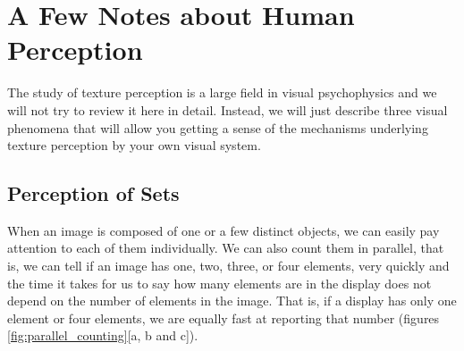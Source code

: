 \section{A Few Notes about Human Perception}


The study of texture perception 
is a large field in visual psychophysics and we will not try to review it here in detail. Instead, we will just describe three visual phenomena that will allow you getting a sense of the mechanisms underlying texture perception by your own visual system. 


\subsection{Perception of Sets}

When an image is composed of one or a few distinct objects, we can easily pay attention to each of them individually. We can also count them in parallel, that is, we can tell if an image has one, two, three, or four elements, very quickly and the time it takes for us to say how many elements are in the display does not depend on the number of elements in the image. That is, if a display has only one element or four elements, we are equally fast at reporting that number (figures {\ref{fig:parallel_counting}[a, b and c])}. 


